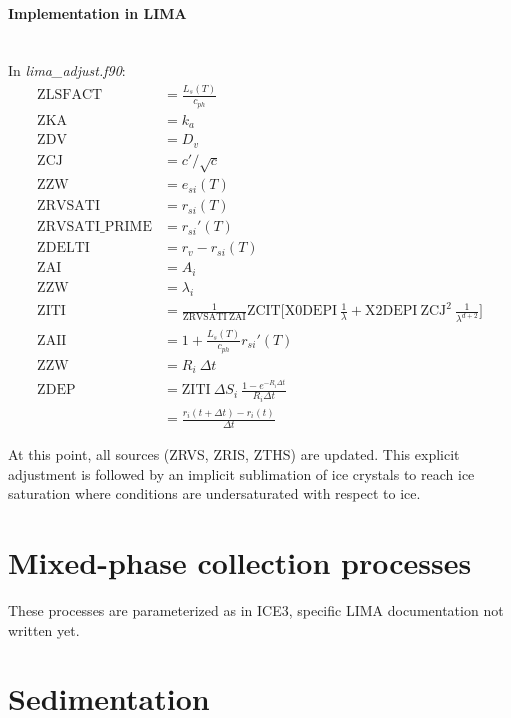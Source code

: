 {\paragraph{Implementation in LIMA}
~\\
In \emph{lima\_adjust.f90}:
\begin{align}
 \mathrm{ZLSFACT} &= \frac{L_s(T)}{c_{ph}} \\
 \mathrm{ZKA} &= k_a \\
 \mathrm{ZDV} &= D_v \\
 \mathrm{ZCJ} &= c'/\sqrt c \\
 \mathrm{ZZW} &= e_{si}(T) \\
 \mathrm{ZRVSATI} &= r_{si}(T) \\
 \mathrm{ZRVSATI\_PRIME} &= r_{si}'(T) \\
 \mathrm{ZDELTI} &= r_v - r_{si}(T) \\
 \mathrm{ZAI} &= A_i \\
 \mathrm{ZZW} &= \lambda_i \\
 \mathrm{ZITI} &= \frac{1}{\mathrm{ZRVSATI} ~ \mathrm{ZAI}} \mathrm{ZCIT} \bigg[\mathrm{X0DEPI} ~ \frac{1}{\lambda} + \mathrm{X2DEPI} ~ \mathrm{ZCJ}^2 ~ \frac{1}{\lambda^{d+2}}\bigg]  \\ 
 \mathrm{ZAII} &= 1 + \frac{L_s(T)}{c_{ph}} r_{si}'(T) \\
 \mathrm{ZZW} &= R_i ~ \Delta t \\
 \mathrm{ZDEP} &= \mathrm{ZITI} ~ \Delta S_i ~ \frac{1 - e^{-R_i\Delta t}}{R_i\Delta t} \\
 &= \frac{r_i(t + \Delta t) - r_i(t)}{\Delta t}
\end{align}

At this point, all sources (ZRVS, ZRIS, ZTHS) are updated. This explicit adjustment is followed by an implicit sublimation of ice crystals to reach ice saturation where conditions are undersaturated with respect to ice.




\section{Mixed-phase collection processes}

These processes are parameterized as in ICE3, specific LIMA documentation not written yet.




\section{Sedimentation}

}
